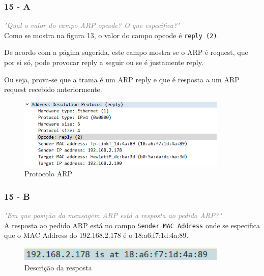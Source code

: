 \documentclass{llncs}
\newcommand{\questionE}[1]{\textcolor{gray}{\textit{"#1"}}}
\begin{document}
\subsubsection{15 - A}
\hspace{3mm} 
\questionE{Qual	o valor do campo ARP opcode? O que especifica?}\\

Como se mostra na figura 13, o valor do campo opcode é \texttt{reply (2)}.

De acordo com a página sugerida, este campo mostra se o ARP é request, que por si só, pode provocar reply a seguir ou se é justamente reply.

Ou seja, prova-se que a trama é um ARP reply e que é resposta a um ARP request recebido anteriormente.

\begin{figure}[H]
\begin{center}
\includegraphics[width=10cm]{15_1.PNG}
\end{center}
\caption{Protocolo ARP}
\end{figure}

\subsubsection{15 - B}
\hspace{3mm} 
\questionE{Em que posição da mensagem ARP está a resposta ao pedido ARP?}\\

A resposta ao pedido ARP está no campo \texttt{Sender MAC Address} onde se especifica que o MAC Address do 192.168.2.178 é o 18:a6:f7:1d:4a:89.

\begin{figure}[H]
\begin{center}
\includegraphics[width=10cm]{15_2.PNG}
\end{center}
\caption{Descrição da resposta}
\end{figure}

\clearpage
\end{document}
